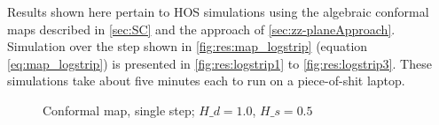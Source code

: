 %
%
%
%
%
%
%

Results shown here pertain to HOS simulations using the algebraic conformal maps described in \autoref{sec:SC} and the approach of \autoref{sec:zz-planeApproach}.
Simulation over the step shown in \autoref{fig:res:map_logstrip} (equation \ref{eq:map_logstrip}) is presented in \autoref{fig:res:logstrip1} to \ref{fig:res:logstrip3}.
These simulations take about five minutes each to run on a piece-of-shit laptop.

\begin{figure}[h!ptb]%
\centering
{}%
\caption{Conformal map, single step; $H\_d = 1.0$, $H\_s = 0.5$}%
\label{fig:res:map_logstrip}%
\end{figure}

